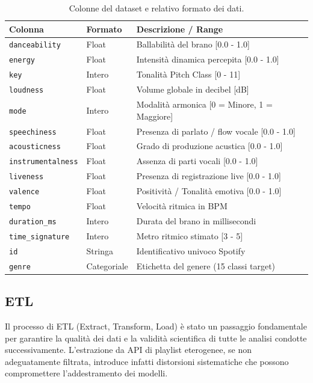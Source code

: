 \documentclass[12pt,a4paper]{article}
\begin{document}
\begin{table}[H]
\centering
\caption{Colonne del dataset e relativo formato dei dati.}
\label{tab:colonne_dataset}
\begin{tabular}{lll}
\toprule
\textbf{Colonna} & \textbf{Formato} & \textbf{Descrizione / Range} \\
\midrule
\texttt{danceability} & Float & Ballabilità del brano [0.0 - 1.0] \\
\texttt{energy} & Float & Intensità dinamica percepita [0.0 - 1.0] \\
\texttt{key} & Intero & Tonalità Pitch Class [0 - 11] \\
\texttt{loudness} & Float & Volume globale in decibel [dB] \\
\texttt{mode} & Intero & Modalità armonica [0 = Minore, 1 = Maggiore] \\
\texttt{speechiness} & Float & Presenza di parlato / flow vocale [0.0 - 1.0] \\
\texttt{acousticness} & Float & Grado di produzione acustica [0.0 - 1.0] \\
\texttt{instrumentalness} & Float & Assenza di parti vocali [0.0 - 1.0] \\
\texttt{liveness} & Float & Presenza di registrazione live [0.0 - 1.0] \\
\texttt{valence} & Float & Positività / Tonalità emotiva [0.0 - 1.0] \\
\texttt{tempo} & Float & Velocità ritmica in BPM \\
\texttt{duration\_ms} & Intero & Durata del brano in millisecondi \\
\texttt{time\_signature} & Intero & Metro ritmico stimato [3 - 5] \\
\texttt{id} & Stringa & Identificativo univoco Spotify \\
\texttt{genre} & Categoriale & Etichetta del genere (15 classi target) \\
\bottomrule
\end{tabular}
\end{table}

\newpage
\subsection{ETL}

Il processo di ETL (Extract, Transform, Load) è stato un passaggio fondamentale per garantire la qualità dei dati e la validità scientifica di tutte le analisi condotte successivamente. L'estrazione da API di playlist eterogenee, se non adeguatamente filtrata, introduce infatti distorsioni sistematiche che possono compromettere l'addestramento dei modelli.
\end{document}

